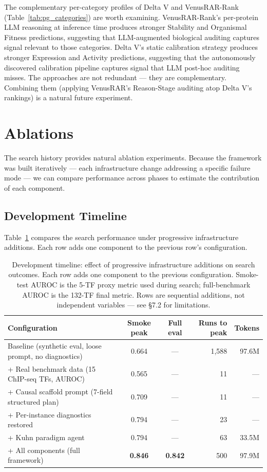 \documentclass[11pt,a4paper]{article}
\begin{document}
The complementary per-category profiles of Delta V and VenusRAR-Rank (Table~\ref{tab:pg_categories}) are worth examining. VenusRAR-Rank's per-protein LLM reasoning at inference time produces stronger Stability and Organismal Fitness predictions, suggesting that LLM-augmented biological auditing captures signal relevant to those categories. Delta V's static calibration strategy produces stronger Expression and Activity predictions, suggesting that the autonomously discovered calibration pipeline captures signal that LLM post-hoc auditing misses. The approaches are not redundant --- they are complementary. Combining them (applying VenusRAR's Reason-Stage auditing atop Delta V's rankings) is a natural future experiment.


\section{Ablations}
\label{sec:ablations}

The search history provides natural ablation experiments. Because the framework was built iteratively --- each infrastructure change addressing a specific failure mode --- we can compare performance across phases to estimate the contribution of each component.

\subsection{Development Timeline}

Table~\ref{tab:ablation} compares the search performance under progressive infrastructure additions. Each row adds one component to the previous row's configuration.

\begin{table}[H]
\centering
\caption{Development timeline: effect of progressive infrastructure additions on search outcomes. Each row adds one component to the previous configuration. Smoke-test AUROC is the 5-TF proxy metric used during search; full-benchmark AUROC is the 132-TF final metric. Rows are sequential additions, not independent variables --- see \S7.2 for limitations.}
\label{tab:ablation}
\small
\begin{tabular}{lccrr}
\toprule
Configuration & Smoke peak & Full eval & Runs to peak & Tokens \\
\midrule
Baseline (synthetic eval, loose prompt, no diagnostics) & 0.664 & ---     & 1,588 & 97.6M \\
+ Real benchmark data (15 ChIP-seq TFs, AUROC)         & 0.565 & ---     & 11    & --- \\
+ Causal scaffold prompt (7-field structured plan)      & 0.709 & ---     & 11    & --- \\
+ Per-instance diagnostics restored                      & 0.794 & ---     & 23    & --- \\
+ Kuhn paradigm agent                                    & 0.794 & ---     & 63    & 33.5M \\
+ All components (full framework)                        & \textbf{0.846} & \textbf{0.842} & 500 & 97.9M \\
\bottomrule
\end{tabular}
\end{table}
\end{document}
